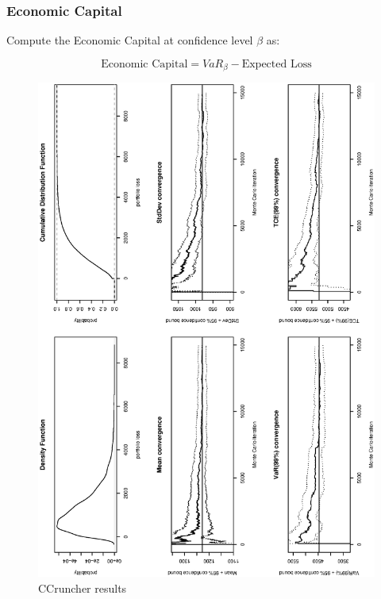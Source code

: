 \documentclass[a4paper,12pt,final]{article}
\begin{document}
\subsubsection{Economic Capital}
Compute the Economic Capital at confidence level $\beta$ as:

\begin{displaymath}
\textrm{Economic Capital} = VaR_{\beta} - \textrm{Expected Loss}
\end{displaymath}


\begin{figure}[p]
\begin{center}
\includegraphics[width=12cm,angle=0]{./images/report.eps}
\caption{CCruncher results}
\label{report}
\end{center}
\end{figure}
\end{document}
